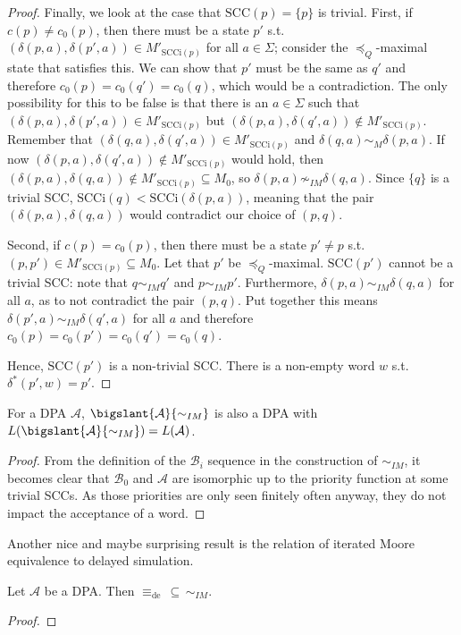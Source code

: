 \begin{proof}
	Finally, we look at the case that $\text{SCC}(p) = \{p\}$ is trivial. First, if $c(p) \neq c_0(p)$, then there must be a state $p'$ s.t. $(\delta(p, a), \delta(p', a)) \in M'_{\text{SCCi}(p)}$ for all $a \in \Sigma$; consider the $\preceq_Q$-maximal state that satisfies this. We can show that $p'$ must be the same as $q'$ and therefore $c_0(p) = c_0(q') = c_0(q)$, which would be a contradiction. The only possibility for this to be false is that there is an $a \in \Sigma$ such that $(\delta(p, a), \delta(p', a)) \in M'_{\text{SCCi}(p)}$ but $(\delta(p, a), \delta(q', a)) \notin M'_{\text{SCCi}(p)}$. Remember that $(\delta(q, a), \delta(q', a)) \in M'_{\text{SCCi}(p)}$ and $\delta(q, a) \sim_M \delta(p, a)$. If now $(\delta(p, a), \delta(q', a)) \notin M'_{\text{SCCi}(p)}$ would hold, then $(\delta(p, a), \delta(q, a)) \notin M'_{\text{SCCi}(p)} \subseteq M_0$, so $\delta(p, a) \not\sim_{IM} \delta(q, a)$. Since $\{q\}$ is a trivial SCC, $\text{SCCi}(q) < \text{SCCi}(\delta(p, a))$, meaning that the pair $(\delta(p, a), \delta(q, a))$ would contradict our choice of $(p, q)$.
	
	Second, if $c(p) = c_0(p)$, then there must be a state $p' \neq p$ s.t. $(p, p') \in M'_{\text{SCCi}(p)} \subseteq M_0$. Let that $p'$ be $\preceq_Q$-maximal. $\text{SCC}(p')$ cannot be a trivial SCC: note that $q \sim_{IM} q'$ and $p \sim_{IM} p'$. Furthermore, $\delta(p, a) \sim_{IM} \delta(q, a)$ for all $a$, as to not contradict the pair $(p, q)$. Put together this means $\delta(p', a) \sim_{IM} \delta(q', a)$ for all $a$ and therefore $c_0(p) = c_0(p') = c_0(q') = c_0(q)$.
	
	Hence, $\text{SCC}(p')$ is a non-trivial SCC. There is a non-empty word $w$ s.t. $\delta^*(p', w) = p'$. %
\end{proof}

\begin{theorem}
	For a DPA $\mathcal{A}$, $\bigslant{\mathcal{A}}{\sim_{IM}}$ is also a DPA with $L(\bigslant{\mathcal{A}}{\sim_{IM}}) = L(\mathcal{A})$.
\end{theorem}

\begin{proof}
	From the definition of the $\mathcal{B}_i$ sequence in the construction of $\sim_{IM}$, it becomes clear that $\mathcal{B}_0$ and $\mathcal{A}$ are isomorphic up to the priority function at some trivial SCCs. As those priorities are only seen finitely often anyway, they do not impact the acceptance of a word. 
\end{proof}

\vspace{0.6cm}
Another nice and maybe surprising result is the relation of iterated Moore equivalence to delayed simulation.

\begin{theorem}
	Let $\mathcal{A}$ be a DPA. Then $\equiv_\text{de} \,\subseteq\, \sim_{IM}$.
\end{theorem}

\begin{proof}
\end{proof}

